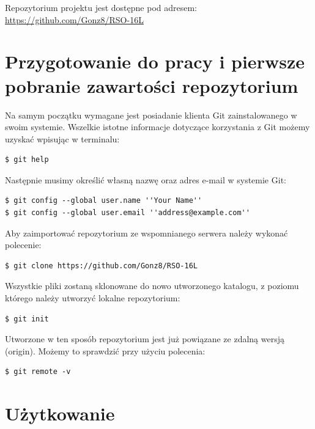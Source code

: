 Repozytorium projektu jest dostępne pod adresem: \url{https://github.com/Gonz8/RSO-16L}

\section{Przygotowanie do pracy i pierwsze pobranie zawartości repozytorium}
	Na samym początku wymagane jest posiadanie klienta Git zainstalowanego w swoim systemie. Wszelkie istotne informacje dotyczące korzystania z Git możemy uzyskać wpisując w terminalu:
\begin{lstlisting}[style=incode]
$ git help
\end{lstlisting}
Następnie musimy określić własną nazwę oraz adres e-mail w systemie Git:
\begin{lstlisting}[style=incode]
$ git config --global user.name ''Your Name''
$ git config --global user.email ''address@example.com''
\end{lstlisting}
Aby zaimportować repozytorium ze wspomnianego serwera należy wykonać polecenie:
\begin{lstlisting}[style=incode]
$ git clone https://github.com/Gonz8/RSO-16L
\end{lstlisting}
Wszystkie pliki zostaną sklonowane do nowo utworzonego katalogu, z poziomu którego należy utworzyć lokalne repozytorium:
\begin{lstlisting}[style=incode]
$ git init
\end{lstlisting}
Utworzone w ten sposób repozytorium jest już powiązane ze zdalną wersją (origin). Możemy to sprawdzić przy użyciu polecenia:
\begin{lstlisting}[style=incode]
$ git remote -v
\end{lstlisting}

\section{Użytkowanie}

